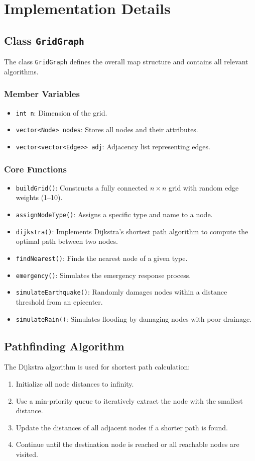 \documentclass[12pt,a4paper]{report}
\begin{document}
\chapter{Implementation Details}

\section{Class \texttt{GridGraph}}
The class \texttt{GridGraph} defines the overall map structure and contains all relevant algorithms.

\subsection{Member Variables}
\begin{itemize}
\item \texttt{int n}: Dimension of the grid.
\item \texttt{vector<Node> nodes}: Stores all nodes and their attributes.
\item \texttt{vector<vector<Edge>> adj}: Adjacency list representing edges.
\end{itemize}

\subsection{Core Functions}
\begin{itemize}
\item \texttt{buildGrid()}: Constructs a fully connected $n \times n$ grid with random edge weights (1–10).
\item \texttt{assignNodeType()}: Assigns a specific type and name to a node.
\item \texttt{dijkstra()}: Implements Dijkstra’s shortest path algorithm to compute the optimal path between two nodes.
\item \texttt{findNearest()}: Finds the nearest node of a given type.
\item \texttt{emergency()}: Simulates the emergency response process.
\item \texttt{simulateEarthquake()}: Randomly damages nodes within a distance threshold from an epicenter.
\item \texttt{simulateRain()}: Simulates flooding by damaging nodes with poor drainage.
\end{itemize}

\section{Pathfinding Algorithm}
The Dijkstra algorithm is used for shortest path calculation:
\begin{enumerate}
\item Initialize all node distances to infinity.
\item Use a min-priority queue to iteratively extract the node with the smallest distance.
\item Update the distances of all adjacent nodes if a shorter path is found.
\item Continue until the destination node is reached or all reachable nodes are visited.
\end{enumerate}
\end{document}
